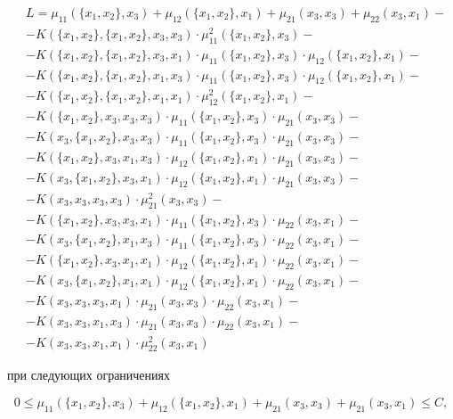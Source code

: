 \documentclass[12pt,a4paper,oneside]{article}
\begin{document}
\begin{eqnarray*}
&L = \mu_{11}(\{x_1, x_2\}, x_3) + \mu_{12}(\{x_1, x_2\}, x_1) + \mu_{21}(x_3, x_3) + \mu_{22}(x_3, x_1) - \\
&- K(\{x_1, x_2\}, \{x_1, x_2\}, x_3, x_3) \cdot \mu^{2}_{11}(\{x_1, x_2\}, x_3) -\\
&- K(\{x_1, x_2\}, \{x_1, x_2\}, x_3, x_1) \cdot \mu_{11}(\{x_1, x_2\}, x_3) \cdot \mu_{12}(\{x_1, x_2\}, x_1) -\\
&- K(\{x_1, x_2\}, \{x_1, x_2\}, x_1, x_3) \cdot \mu_{11}(\{x_1, x_2\}, x_3) \cdot \mu_{12}(\{x_1, x_2\}, x_1) -\\
&- K(\{x_1, x_2\}, \{x_1, x_2\}, x_1, x_1) \cdot \mu^{2}_{12}(\{x_1, x_2\}, x_1) -\\
&- K(\{x_1, x_2\}, x_3, x_3, x_3) \cdot \mu_{11}(\{x_1, x_2\}, x_3) \cdot \mu_{21}(x_3, x_3) -\\
&- K(x_3, \{x_1, x_2\}, x_3, x_3) \cdot \mu_{11}(\{x_1, x_2\}, x_3) \cdot \mu_{21}(x_3, x_3) -\\
&- K(\{x_1, x_2\}, x_3, x_1, x_3) \cdot \mu_{12}(\{x_1, x_2\}, x_1) \cdot \mu_{21}(x_3, x_3) -\\
&- K(x_3, \{x_1, x_2\}, x_3, x_1) \cdot \mu_{12}(\{x_1, x_2\}, x_1) \cdot \mu_{21}(x_3, x_3) -\\
&- K(x_3, x_3, x_3, x_3) \cdot \mu^{2}_{21}(x_3, x_3) -\\
&- K(\{x_1, x_2\}, x_3, x_3, x_1) \cdot \mu_{11}(\{x_1, x_2\}, x_3) \cdot \mu_{22}(x_3, x_1) -\\
&- K(x_3, \{x_1, x_2\}, x_1, x_3) \cdot \mu_{11}(\{x_1, x_2\}, x_3) \cdot \mu_{22}(x_3, x_1) -\\
&- K(\{x_1, x_2\}, x_3, x_1, x_1) \cdot \mu_{12}(\{x_1, x_2\}, x_1) \cdot \mu_{22}(x_3, x_1) -\\
&- K(x_3, \{x_1, x_2\}, x_1, x_1) \cdot \mu_{12}(\{x_1, x_2\}, x_1) \cdot \mu_{22}(x_3, x_1) -\\
&- K(x_3, x_3, x_3, x_1) \cdot \mu_{21}(x_3, x_3) \cdot \mu_{22}(x_3, x_1) -\\
&- K(x_3, x_3, x_1, x_3) \cdot \mu_{21}(x_3, x_3) \cdot \mu_{22}(x_3, x_1) -\\
&- K(x_3, x_3, x_1, x_1) \cdot \mu^{2}_{22}(x_3, x_1)
\end{eqnarray*}

\par
при следующих ограничениях

\[
0 \leq \mu_{11}(\{x_1, x_2\}, x_3) + \mu_{12}(\{x_1, x_2\}, x_1) + \mu_{21}(x_3, x_3) + \mu_{21}(x_3, x_1) \leq C,
\]
\end{document}

